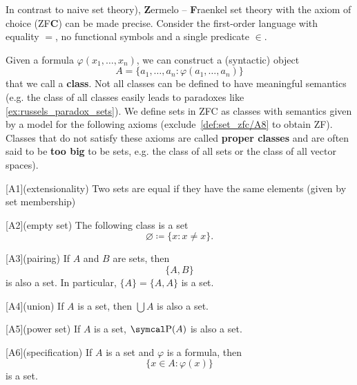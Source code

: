 \begin{definition}\label{def:set_zfc}\cite[271]{Enderton1977}
  In contrast to naive set theory), \textbf{Z}ermelo – \textbf{F}raenkel set theory with the axiom of choice (ZF\textbf{C}) can be made precise. Consider the first-order language with equality \( = \), no functional symbols and a single predicate \( \in \).

  Given a formula \( \varphi(x_1, \ldots, x_n) \), we can construct a (syntactic) object
  \begin{equation*}
    A = \{ a_1, \ldots, a_n \colon \varphi(a_1, \ldots, a_n) \}
  \end{equation*}
  that we call a \textbf{class}. Not all classes can be defined to have meaningful semantics (e.g. the class of all classes easily leads to paradoxes like \cref{ex:russels_paradox_sets}). We define sets in ZFC as classes with semantics given by a model for the following axioms (exclude~\ref{def:set_zfc/A8} to obtain ZF). Classes that do not satisfy these axioms are called \textbf{proper classes} and are often said to be \textbf{too big} to be sets, e.g. the class of all sets or the class of all vector spaces).

  \begin{description}
    [A1](extensionality) Two sets are equal if they have the same elements (given by set membership)

    [A2](empty set) The following class is a set
    \begin{equation*}
      \varnothing \coloneqq \{ x \colon x \neq x \}.
    \end{equation*}

    [A3](pairing) If \( A \) and \( B \) are sets, then
    \begin{equation*}
      \{ A, B \}
    \end{equation*}
    is also a set. In particular, \( \{ A \} = \{ A, A \} \) is a set.

    [A4](union) If \( A \) is a set, then \( \bigcup A \) is also a set.

    [A5](power set) If \( A \) is a set, \( \Power(A) \) is also a set.

    [A6](specification) If \( A \) is a set and \( \varphi \) is a formula, then
    \begin{equation*}
      \{ x \in A \colon \varphi(x) \}
    \end{equation*}
    is a set.


\end{description}
\end{definition}
